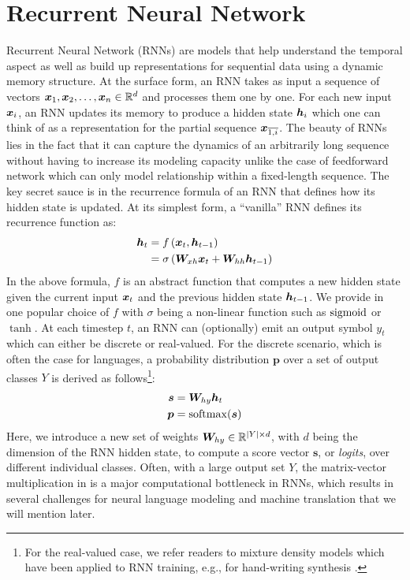 \section{Recurrent Neural Network}
Recurrent Neural Network (RNNs) \cite{elman90} are models that help understand
the temporal aspect as well as build up representations for sequential data
using a dynamic memory structure. At the surface form, an RNN takes as input a sequence of vectors $\bm{x}_{1},
\bm{x}_{2}, \ldots, \bm{x}_{n} \in \mathbb{R}^{d}$ and processes them one by one. For each
new input $\bm{x}_{i}$, an RNN updates its memory to produce a hidden state
$\bm{h}_{i}$ which one can think of as a representation for the partial sequence
$\bm{x}_{\overline{1,i}}$. %
The beauty of RNNs lies in the fact that it can
capture the dynamics of an arbitrarily long sequence without having to increase its modeling
capacity unlike the case of feedforward network which can only model
relationship within a fixed-length sequence. The key secret sauce is in the
recurrence formula of an RNN that defines how its hidden state is updated. At
its simplest form, a ``vanilla'' RNN defines its recurrence function as:
\begin{align}
\mbox{\boldmath{$h$}}_t &= f\left(\bm{x}_{t}, \bm{h}_{t-1}\right) \label{e:abstract_rnn} \\
&= \sigma \left(\bm{W}_{xh}\bm{x}_{t} + \bm{W}_{hh}\bm{h}_{t-1}\right) \label{e:vanilla_rnn}
\end{align}
In the above formula, $f$ is an abstract function that computes a new hidden state given the current input $\bm{x}_{t}$ and the
previous hidden state $\bm{h}_{t-1}$. We provide in  one popular choice
of $f$ with $\sigma$ being a non-linear function such as $\operatorname{sigmoid}$ or $\tanh$.
At each timestep $t$, an RNN can (optionally) emit an output symbol
$y_t$ which can either be discrete or real-valued. For the discrete scenario,
which is often the case for languages, a probability distribution $\bm{p}$ over a 
set of output classes $Y$ is derived as
follows\footnote{For the real-valued case, we refer readers to mixture density
models \cite{bishop94} which have been applied to RNN training, e.g., for
hand-writing synthesis \cite{graves13c}.}:
\begin{align}
\bm{s} &= \bm{W}_{hy}\bm{h}_{t} \label{e:score} \\
\bm{p} &= \operatorname{softmax}(\bm{s}) \label{e:prob}
\end{align}
Here, we introduce a new set of weights $\bm{W}_{hy} \in \mathbb{R}^{|Y| \times d}$, with $d$ being the dimension of the RNN hidden
state, to compute a score vector $\bm{s}$, or {\it logits}, over
different individual classes. Often, with a large output set $Y$, the
matrix-vector multiplication in  is a major computational
bottleneck in RNNs, which results in several challenges for neural language modeling
and machine translation that we will mention later. 


